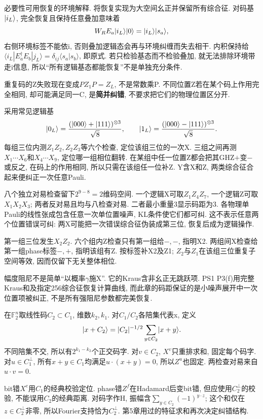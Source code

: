 必要性可用恢复的环境解释. 将恢复实现为大空间幺正并保留所有综合征. 对码基$\lvert i_L\rangle$, 完全恢复且保持任意叠加意味着
\[W_R E_a\lvert i_L\rangle\lvert 0\rangle=\lvert i_L\rangle\lvert s_a\rangle,\]
右侧环境标签不能依i, 否则叠加逻辑态会再与环境纠缠而失去相干. 内积保持给$\langle i_L|E_a^\dagger E_b|j_L\rangle=\delta_{ij}\langle s_a|s_b\rangle$, 即原式. 若只检验基态而不检验叠加, 就无法排除环境带走i信息, 所以“所有逻辑基态都能恢复”不是单独充分条件.

重复码的Z失败现在变成$PZ_1P=Z_L$, 不是常数乘P. 不同位置Z若在某个码上作用完全相同, 却可能满足同一C, 是\textbf{简并纠错}, 不要求把它们的物理位置区分开.

采用常见逻辑基
\[\lvert 0_L\rangle=\frac{(\lvert 000\rangle+\lvert 111\rangle)^{\otimes3}}{\sqrt8},\qquad
\lvert 1_L\rangle=\frac{(\lvert 000\rangle-\lvert 111\rangle)^{\otimes3}}{\sqrt8}.\]
每组三位内测$Z_1Z_2,Z_2Z_3$等六个检查, 定位该组三位的一次X. 三组之间再测$X_1\cdots X_6$和$X_4\cdots X_9$, 定位哪一组相位翻转. 在某组中任一位置Z都会把其GHZ$+$变$-$或反之, 在码上的作用相同, 所以只需在该组任一位补Z. Y含X和Z, 两类综合征合起来便纠正一次任意Pauli.

八个独立对易检查留下$2^{9-8}=2$维码空间. 一个逻辑X可取$Z_1Z_4Z_7$, 一个逻辑Z可取$X_1X_2X_3$; 两者反对易且均与八检查对易. 二者最小重量3显示码距为3. 各物理单Pauli的线性张成包含任意一次单位置噪声, KL条件使它们都可纠. 这不表示任意两个位置错误可纠: 两X可能把一次错误综合征伪装成第三位, 恢复后成为逻辑操作.

\begin{example}第一组三位发生$X_2Z_2$. 六个组内Z检查只有第一组给$-,-$, 指明X2. 两组间X检查给第一组phase标签$-,+$, 指明该组有Z. 按标签补X2及Z1; $Z_2$与$Z_1$在该组三位重复子空间等效, 因而仅留下无关整体相位.\end{example}

幅度阻尼不是简单“以概率$\gamma$施X”. 它的Kraus含非幺正无跳跃项. PS1 P3(f)用完整Kraus和及指定256综合征恢复计算曲线, 而此章的码距保证的是小噪声展开中一次位置项被纠正, 不是所有强阻尼参数都完美恢复.

在$\mathbb F_2^n$取线性码$C_2\subset C_1$, 维数$k_2,k_1$. 对$C_1/C_2$各陪集代表x, 定义
\[\lvert x+C_2\rangle=|C_2|^{-1/2}\sum_{y\in C_2}\lvert x+y\rangle.\]
不同陪集不交, 所以有$2^{k_1-k_2}$个正交码字. 对$v\in C_2$, $X^v$只重排求和, 固定每个码字. 对$u\in C_1^\perp$, 所有$x+y\in C_1$均满足$u\cdot(x+y)=0$, 所以$Z^u$也固定. 两检查对易来自$u\cdot v=0$.

bit错$X^e$用$C_1$的经典校验定位. phase错$Z^f$在Hadamard后变bit错, 但应使用$C_2^\perp$的校验, 不能误用$C_2$的经典距离. 对码字作H, 振幅含$\sum_{y\in C_2}(-1)^{y\cdot z}$; 这个和仅在$z\in C_2^\perp$非零, 所以Fourier支持恰为$C_2^\perp$. 第5章用过的特征求和再次决定纠错结构.

